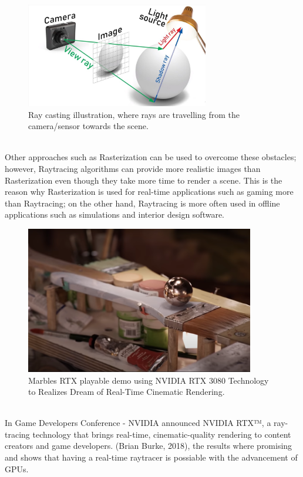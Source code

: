 \documentclass[11pt,a4paper]{article}
\begin{document}
\begin{figure}[h]	
     \centering
     \captionsetup{justification=centering,margin=2cm}
     \includegraphics[width=8cm]{images/raytracer_2.jpg}
     \caption{Ray casting illustration, where rays are travelling from the camera/sensor towards the scene. \protect\cite{Kimathi2020}}
        \label{fig:dice}
\end{figure}

\noindent
\\
Other approaches such as Rasterization can be used to overcome these obstacles; however, Raytracing algorithms can provide more realistic images than Rasterization even though they take more time to render a scene. This is the reason why  Rasterization is used for real-time applications such as gaming more than Raytracing; on the other hand, Raytracing is more often used in offline applications such as simulations and interior design software.
\clearpage

\begin{figure}[h]	
     \centering
     \captionsetup{justification=centering,margin=2cm}
     \includegraphics[width=10cm]{images/marbel_brush.png}
     \caption{Marbles RTX playable demo using NVIDIA RTX 3080 Technology to Realizes Dream of Real-Time Cinematic Rendering.\protect\cite{Burke2018}}
        \label{fig:dice}
\end{figure}

\noindent
\\
In Game Developers Conference - NVIDIA announced NVIDIA RTX™, a ray-tracing technology that brings real-time, cinematic-quality rendering to content creators and game developers. (Brian Burke, 2018), the results where promising and shows that having a real-time raytracer is possiable with the advancement of GPUs. 
\end{document}
